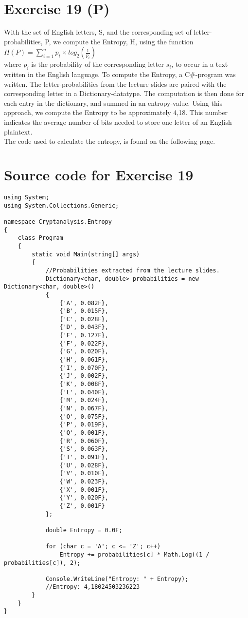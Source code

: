 \section{Exercise 19 (P)}

With the set of English letters, S, and the corresponding set of letter-probabilities, P, we compute the Entropy, H, using the function\\
$H(P) = \sum_{i=1}^{n} p_i \times log_2(\frac{1}{p_i}) $\\
where $p_i$ is the probability of the corresponding letter $s_i$, to occur in a text written in the English language.
To compute the Entropy, a C\#-program was written. The letter-probabilities from the lecture slides are paired with the corresponding letter in a Dictionary-datatype. The computation is then done for each entry in the dictionary, and summed in an entropy-value. Using this approach, we compute the Entropy to be approximately 4,18. This number indicates the average number of bits needed to store one letter of an English plaintext. \\
The code used to calculate the entropy, is found on the following page.

\newpage
\section{Source code for Exercise 19}
\begin{lstlisting}
using System;
using System.Collections.Generic;

namespace Cryptanalysis.Entropy
{
    class Program
    {
        static void Main(string[] args)
        {
            //Probabilities extracted from the lecture slides.
            Dictionary<char, double> probabilities = new Dictionary<char, double>()
            {
                {'A', 0.082F},
                {'B', 0.015F},
                {'C', 0.028F},
                {'D', 0.043F},
                {'E', 0.127F},
                {'F', 0.022F},
                {'G', 0.020F},
                {'H', 0.061F},
                {'I', 0.070F},
                {'J', 0.002F},
                {'K', 0.008F},
                {'L', 0.040F},
                {'M', 0.024F},
                {'N', 0.067F},
                {'O', 0.075F},
                {'P', 0.019F},
                {'Q', 0.001F},
                {'R', 0.060F},
                {'S', 0.063F},
                {'T', 0.091F},
                {'U', 0.028F},
                {'V', 0.010F},
                {'W', 0.023F},
                {'X', 0.001F},
                {'Y', 0.020F},
                {'Z', 0.001F}
            };

            double Entropy = 0.0F;

            for (char c = 'A'; c <= 'Z'; c++)
                Entropy += probabilities[c] * Math.Log((1 / probabilities[c]), 2);

            Console.WriteLine("Entropy: " + Entropy);
            //Entropy: 4,18024503236223
        }
    }
}

\end{lstlisting}